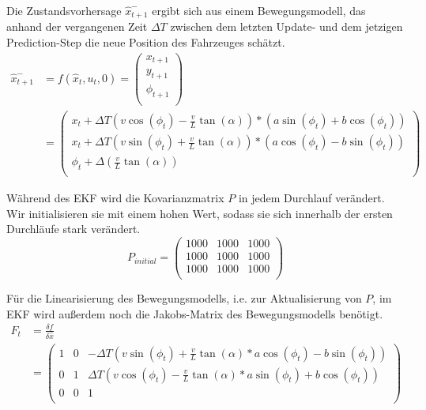 \documentclass[11pt]{article}
\begin{document}
Die Zustandsvorhersage $\hat{x}_{t+1}^-$ ergibt sich aus einem Bewegungsmodell, das anhand der vergangenen Zeit $\Delta T$ zwischen dem letzten Update- und dem jetzigen Prediction-Step die neue Position des Fahrzeuges schätzt. 
\begin{equation}\label{EKF-Motion-Model}
\begin{split}
	\hat{x}_{t+1}^- &= f(\hat{x}_{t},u_t,0) = \begin{pmatrix}
		x_{t+1} \\
		y_{t+1} \\
		\phi_{t+1} \\
	  \end{pmatrix} \\
	  &= \begin{pmatrix}
		  x_{t}+\Delta T(v\cos(\phi_t)-\frac{v}{L}\tan(\alpha))*(a\sin(\phi_t)+b\cos(\phi_t)) \\
		  x_{t}+\Delta T(v\sin(\phi_t)+\frac{v}{L}\tan(\alpha))*(a\cos(\phi_t)-b\sin(\phi_t)) \\
		  \phi_t + \Delta(\frac{v}{L}\tan(\alpha)) \\
	  \end{pmatrix}
\end{split}
\end{equation}

Während des EKF wird die Kovarianzmatrix $P$ in jedem Durchlauf verändert. Wir initialisieren sie mit einem hohen Wert, sodass sie sich innerhalb der ersten Durchläufe stark verändert. 
\begin{equation}\label{EKF-Initiale-Kovarianzmatrix}
	P_{initial} = \begin{pmatrix}
		1000 & 1000 & 1000 \\
		1000 & 1000 & 1000 \\
		1000 & 1000 & 1000 \\
	  \end{pmatrix}
\end{equation}

Für die Linearisierung des Bewegungsmodells, i.e. zur Aktualisierung von $P$, im EKF wird außerdem noch die Jakobs-Matrix des Bewegungsmodells benötigt.
\begin{equation}\label{EKF-Motion-Model-Jakobs-Matrix}
\begin{split}
	F_t &= \frac{\delta f}{\delta \hat{x}} \\
	&= \begin{pmatrix}
		1 & 0 & -\Delta T(v\sin(\phi_t)+\frac{v}{L}\tan(\alpha)*a\cos(\phi_t)-b\sin(\phi_t)) \\
		0 & 1 & \Delta T(v\cos(\phi_t)-\frac{v}{L}\tan(\alpha)*a\sin(\phi_t)+b\cos(\phi_t)) \\
		0 & 0 & 1 \\
	  \end{pmatrix}
\end{split}
\end{equation}
\end{document}

